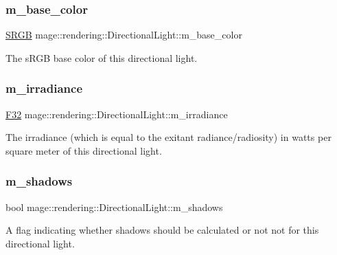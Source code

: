 \subsubsection{\texorpdfstring{m\+\_\+base\+\_\+color}{m\_base\_color}}
{\footnotesize\ttfamily \hyperlink{structmage_1_1_s_r_g_b}{S\+R\+GB} mage\+::rendering\+::\+Directional\+Light\+::m\+\_\+base\+\_\+color\hspace{0.3cm}{\ttfamily [private]}}

The s\+R\+GB base color of this directional light. \hypertarget{classmage_1_1rendering_1_1_directional_light_a72b58bf80a9f40934622aee9f68aa545}{}\label{classmage_1_1rendering_1_1_directional_light_a72b58bf80a9f40934622aee9f68aa545} 
\subsubsection{\texorpdfstring{m\+\_\+irradiance}{m\_irradiance}}
{\footnotesize\ttfamily \hyperlink{namespacemage_aa97e833b45f06d60a0a9c4fc22ae02c0}{F32} mage\+::rendering\+::\+Directional\+Light\+::m\+\_\+irradiance\hspace{0.3cm}{\ttfamily [private]}}

The irradiance (which is equal to the exitant radiance/radiosity) in watts per square meter of this directional light. \hypertarget{classmage_1_1rendering_1_1_directional_light_a64fa40ef9f9d0ae8a0856aabd44f0cae}{}\label{classmage_1_1rendering_1_1_directional_light_a64fa40ef9f9d0ae8a0856aabd44f0cae} 
\subsubsection{\texorpdfstring{m\+\_\+shadows}{m\_shadows}}
{\footnotesize\ttfamily bool mage\+::rendering\+::\+Directional\+Light\+::m\+\_\+shadows\hspace{0.3cm}{\ttfamily [private]}}

A flag indicating whether shadows should be calculated or not not for this directional light. 